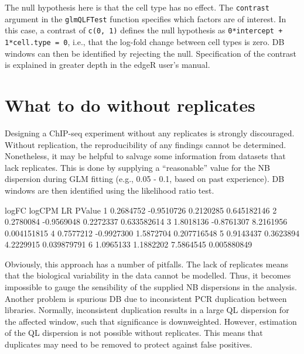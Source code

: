 \documentclass[12pt]{report}
\renewenvironment{Schunk}{\vspace{0pt}}{\vspace{0pt}}
\newcommand{\edger}{edgeR}
\newcommand{\code}[1]{{\small\texttt{#1}}}
\begin{document}
The null hypothesis here is that the cell type has no effect. 
The \code{contrast} argument in the \code{glmQLFTest} function specifies which factors are of interest. 
In this case, a contrast of \code{c(0, 1)} defines the null hypothesis as \code{0*intercept + 1*cell.type = 0}, i.e., that the log-fold change between cell types is zero. 
DB windows can then be identified by rejecting the null. 
Specification of the contrast is explained in greater depth in the \edger{} user's manual. 

\section{What to do without replicates}
Designing a ChIP-seq experiment without any replicates is strongly discouraged.
Without replication, the reproducibility of any findings cannot be determined. 
Nonetheless, it may be helpful to salvage some information from datasets that lack replicates.
This is done by supplying a ``reasonable'' value for the NB dispersion during GLM fitting (e.g., 0.05 - 0.1, based on past experience).
DB windows are then identified using the likelihood ratio test.

\begin{Schunk}
\begin{Soutput}
      logFC     logCPM        LR      PValue
1 0.2684752 -0.9510726 0.2120285 0.645182146
2 0.2780084 -0.9569048 0.2272337 0.633582614
3 1.8018136 -0.8761307 8.2161956 0.004151815
4 0.7577212 -0.9927300 1.5872704 0.207716548
5 0.9143437  0.3623894 4.2229915 0.039879791
6 1.0965133  1.1882202 7.5864545 0.005880849
\end{Soutput}
\end{Schunk}

Obviously, this approach has a number of pitfalls. 
The lack of replicates means that the biological variability in the data cannot be modelled.
Thus, it becomes impossible to gauge the sensibility of the supplied NB dispersions in the analysis.
Another problem is spurious DB due to inconsistent PCR duplication between libraries.
Normally, inconsistent duplication results in a large QL dispersion for the affected window, such that significance is downweighted.
However, estimation of the QL dispersion is not possible without replicates.
This means that duplicates may need to be removed to protect against false positives.
\end{document}
